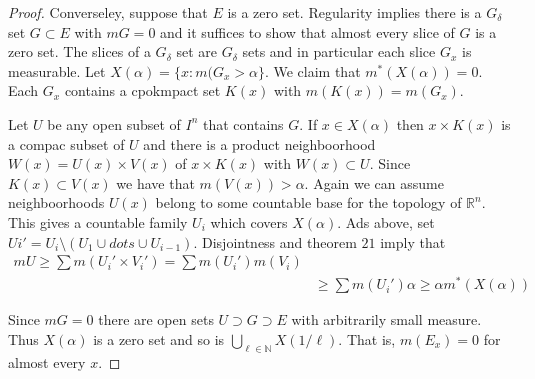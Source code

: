 \documentclass[letter]{article}
\newenvironment{menumerate}{%
  \edef\backupindent{\the\parindent}%
  \enumerate%
  \setlength{\parindent}{\backupindent}%
}{\endenumerate}
\begin{document}
\begin{menumerate}
\begin{proof}
        Converseley, suppose that $E$ is a zero set. Regularity implies there is a $G_\delta$ set $G \subset E$ with $mG = 0$
        and it suffices to show that almost every slice of $G$ is a zero set.
        The slices of a $G_\delta$ set are $G_\delta$ sets and in particular each slice $G_x$ is measurable.
        Let $X(\alpha) = \{x : m(G_x > \alpha\}. $ We claim that $m^*(X(\alpha)) = 0.$ Each $G_x$ contains a cpokmpact set
        $K(x)$ with $m(K(x)) = m(G_x).$

        Let $U$ be any open subset of $I^n$ that contains $G$. If $x \in X(\alpha)$ then $x \times K(x)$ is a compac
        subset of $U$ and there is a product neighboorhood $W(x) = U(x) \times V(x)$ of $x\times K(x)$ with $W(x) \subset U.$
        Since $K(x) \subset V(x)$ we have that $m(V(x)) > \alpha.$ Again we can assume neighboorhoods $U(x)$ belong
        to some countable base for the topology of $\mathbb{R}^n.$ This gives a countable family $U_i$ which covers
        $X(\alpha).$ Ads above, set $Ui' = U_i \setminus (U_1 \cup dots \cup U_{i-1}).$ Disjointness and theorem $21$
        imply that
        \begin{equation}
            \begin{aligned}
                mU \geq \sum m(U_i'\times V_i') = \sum m(U_i') m(V_i) \\
                &\geq \sum m(U_i')\alpha \geq \alpha m^*(X(\alpha))
            \end{aligned}
         \end{equation} 

         Since $mG = 0$ there are open sets $U \supset G \supset E$ with arbitrarily small measure. Thus $X(\alpha)$
         is a zero set and so is $\bigcup_{\ell \in \mathbb{N}} X(1/\ell)$. That is, $m(E_x) = 0$ for almost every $x.$
    \end{proof}
\end{menumerate}
\end{document}
